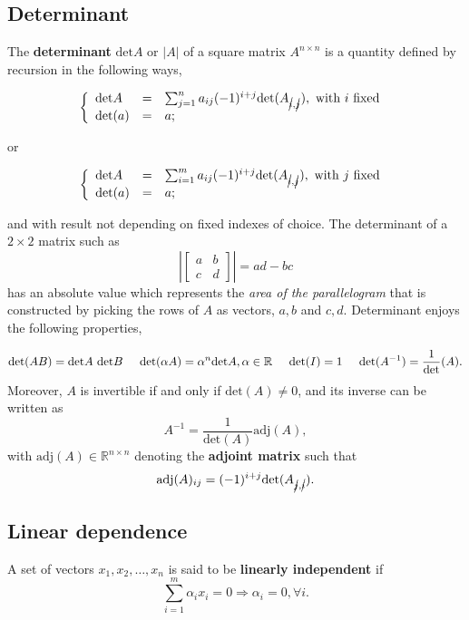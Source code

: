\documentclass[10pt]{report}
\begin{document}
\subsection{Determinant}
\label{sec:org5fcd523}
The \textbf{determinant} \(\mbox{det}A\) or \(|A|\) of a square matrix \(A^{n \times n}\) is a quantity defined by recursion in the following ways,

$$\left\{\begin{array}{lll} \mbox{det}A & = & \sum_{j=1}^n a_{ij}(-1)^{i+j}\mbox{det}(A_{\cancel i,\cancel j}), \mbox{ with } i \mbox{ fixed } \\ \mbox{det}(a) & = & a;\end{array}\right.$$

or

$$\left\{\begin{array}{lll} \mbox{det}A & = & \sum_{i=1}^m a_{ij}(-1)^{i+j}\mbox{det}(A_{\cancel i,\cancel j}), \mbox{ with } j \mbox{ fixed } \\ \mbox{det}(a) & = & a;\end{array}\right.$$

and with result not depending on fixed indexes of choice. The determinant of a \(2\times 2\) matrix such as $$\left|\begin{bmatrix}a & b \\ c & d\end{bmatrix}\right| = ad - bc$$ has an absolute value which represents the \emph{area of the parallelogram} that is constructed by picking the rows of \(A\) as vectors, \(a, b\) and \(c, d\). Determinant enjoys the following properties,

$$\mbox{det}(AB) = \mbox{det}A\mbox{ det}B \hspace*{0.5cm} \mbox{det}(\alpha A) = \alpha^n\mbox{det}A, \alpha \in \mathbb R \hspace*{0.5cm} \mbox{det}(I) = 1 \hspace*{0.5cm} \mbox{det}(A^{-1}) = \frac {1}{\mbox{det}}(A).$$ Moreover, \(A\) is invertible if and only if \(\mbox{det}(A) \neq 0\), and its inverse can be written as $$A^{-1} = \frac{1}{\mbox{det}(A)}\mbox{adj}(A),$$ with \(\mbox{adj}(A) \in \mathbb{R}^{n \times n}\) denoting the \textbf{adjoint matrix} such that $$\mbox{adj}(A)_{ij} =(-1)^{i+j}\mbox{det}(A_{\cancel j,\cancel i}).$$
\subsection{Linear dependence}
\label{sec:orgb667612}
A set of vectors \(x_1, x_2, \dots, x_n\) is said to be \textbf{linearly independent} if $$\sum_{i=1}^m \alpha_i x_i = 0 \Longrightarrow \alpha_i = 0, \forall i.$$
\end{document}
